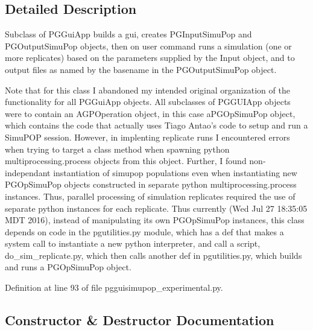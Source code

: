 \subsection{Detailed Description}
\begin{DoxyVerb}Subclass of PGGuiApp builds a gui,
creates PGInputSimuPop and PGOutputSimuPop
objects, then on user command runs a simulation 
(one or more replicates) based on the parameters 
supplied by the Input object, and to output files 
as named by the basename in the PGOutputSimuPop object.  

Note that for this class I abandoned my intended original 
organization of the functionality for all  PGGuiApp objects.
All subclasses of PGGUIApp objects were to contain an 
AGPOperation object, in this case aPGOpSimuPop object, 
which contains the code that actually uses Tiago Antao's 
code to setup and run a SimuPOP session.  However, in 
implenting replicate runs I encountered errors when
trying to target a class method when spawning python
multiprocessing.process objects from this object.  Further,
I found non-independant instantiation of simupop populations 
even when instantiating new PGOpSimuPop objects constructed
in separate python multiprocessing.process instances.   
Thus, parallel processing of simulation replicates required 
the use of separate python instances for each replicate. 
Thus currently (Wed Jul 27 18:35:05 MDT 2016),
instead of manipulating its own PGOpSimuPop instances,
this class depends on code in the pgutilities.py
module, which has a def that makes a system call to 
instantiate a new python interpreter, and call a script,
do_sim_replicate.py, which then calls another def in 
pgutilities.py, which builds and runs a PGOpSimuPop object.\end{DoxyVerb}
 

Definition at line 93 of file pgguisimupop\+\_\+experimental.\+py.



\subsection{Constructor \& Destructor Documentation}
